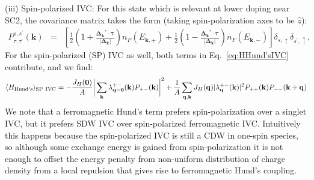 \documentclass[aps,pra,twocolumn,superscriptaddress,10pt,article,nofootinbib,showpacs,longbibliography]{revtex4-1}
\def \ua{\uparrow}
\def \k{{\mathbf k}}
\def \q{{\mathbf q}}
\def \beq{\begin{eqnarray}}
\def \eeq{\end{eqnarray}}
\begin{document}
(iii) Spin-polarized IVC: For this state which is relevant at lower doping near SC2, the covariance matrix takes the form (taking spin-polarization axes to be $\hat{z}$):
\beq
P_{\tau,\tau^\prime}^{s,s^\prime}(\k) &=&  \left[ \frac{1}{2}\left( 1 + \frac{\bm{\Delta_\k}^* \cdot \bm{\tau}}{|\bm{\Delta_\k|}} \right) n_F(E_{\k,+}) + \frac{1}{2}\left( 1 - \frac{\bm{\Delta_\k}^* \cdot \bm{\tau}}{|\bm{\Delta_\k|}} \right) n_F(E_{\k,-}) \right]\delta_{s,\ua} \delta_{s^\prime,\ua},
\eeq
For the spin-polarized (SP) IVC as well, both terms in Eq.~\eqref{eq:HHund'sIVC} contribute, and we find:
\beq
\langle H_{\rm Hund's} \rangle_{\rm SP ~IVC} = - \frac{J_H(\mathbf{0})}{A}  \bigg| \sum_\k \lambda^{+-}_{\q = \mathbf{0}}(\k)  P_{+-}(\k) \bigg|^2  + \frac{1}{A} \sum_{\q, \k} J_H(\q) |\lambda^{+-}_{\q}(\k)|^2 P_{++}(\k) P_{--}(\k+\q)
\eeq
We note that a ferromagnetic Hund's term prefers spin-polarization over a singlet IVC, but it prefers SDW IVC over spin-polarized ferromagnetic IVC.
Intuitively this happens because the spin-polarized IVC is still a CDW in one-spin species, so although some exchange energy is gained from spin-polarization it is not enough to offset the energy penalty from non-uniform distribution of charge density from a local repulsion that gives rise to ferromagnetic Hund's coupling. 
\end{document}

